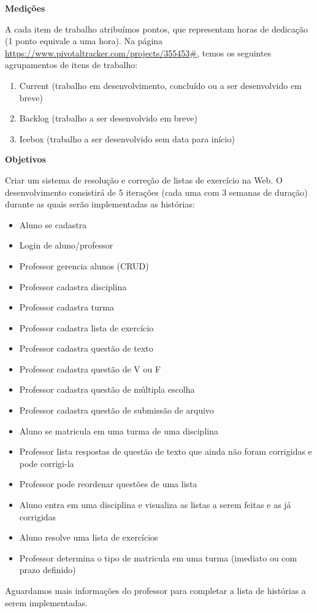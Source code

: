 \documentclass[12pt,letterpaper]{article}
\begin{document}
\vspace{1cm}
{\large {\bf Medições}}
\vspace{0.5cm}

A cada item de trabalho atribuímos pontos, que representam horas de dedicação (1 ponto equivale a uma hora).
Na página \url{https://www.pivotaltracker.com/projects/355453#}, temos os seguintes agrupamentos de itens de trabalho:
\begin{enumerate}
\item{Current (trabalho em desenvolvimento, concluído ou a ser desenvolvido em breve)}
\item{Backlog (trabalho a ser desenvolvido em breve)}
\item{Icebox (trabalho a ser desenvolvido sem data para início)}
\end{enumerate}

\vspace{1cm}
{\large {\bf Objetivos}}
\vspace{0.5cm}

Criar um sistema de resolução e correção de listas de exercício na Web.
O desenvolvimento consistirá de 5 iterações (cada uma com 3 semanas de duração) durante as quais serão implementadas as histórias:

\begin{itemize}
\item{Aluno se cadastra}
\item{Login de aluno/professor}
\item{Professor gerencia alunos (CRUD)}
\item{Professor cadastra disciplina}
\item{Professor cadastra turma}
\item{Professor cadastra lista de exercício}
\item{Professor cadastra questão de texto}
\item{Professor cadastra questão de V ou F}
\item{Professor cadastra questão de múltipla escolha}
\item{Professor cadastra questão de submissão de arquivo}
\item{Aluno se matricula em uma turma de uma disciplina}
\item{Professor lista respostas de questão de texto que ainda não foram corrigidas e pode corrigi-la}
\item{Professor pode reordenar questões de uma lista}
\item{Aluno entra em uma disciplina e visualiza as listas a serem feitas e as já corrigidas}
\item{Aluno resolve uma lista de exercícios}
\item{Professor determina o tipo de matricula em uma turma (imediato ou com prazo definido)}
\end{itemize}
Aguardamos mais informações do professor para completar a lista de histórias a serem implementadas.
\end{document}
